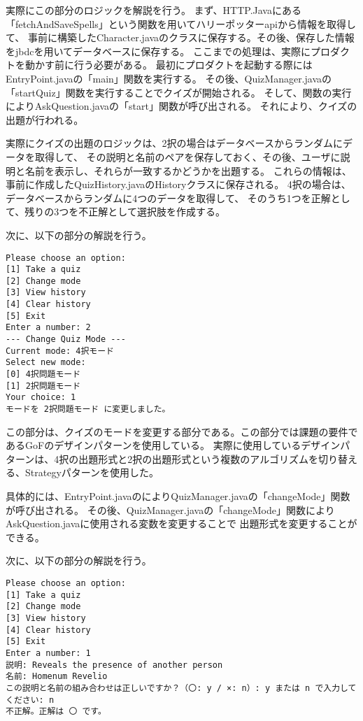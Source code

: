 \documentclass[uplatex,dvipdfmx,a4paper]{jsarticle}
\begin{document}
\par 実際にこの部分のロジックを解説を行う。
まず、HTTP.Javaにある「fetchAndSaveSpells」という関数を用いてハリーポッターapiから情報を取得して、
事前に構築したCharacter.javaのクラスに保存する。その後、保存した情報をjbdcを用いてデータベースに保存する。
ここまでの処理は、実際にプロダクトを動かす前に行う必要がある。
最初にプロダクトを起動する際にはEntryPoint.javaの「main」関数を実行する。
その後、QuizManager.javaの「startQuiz」関数を実行することでクイズが開始される。
そして、関数の実行によりAskQuestion.javaの「start」関数が呼び出される。
それにより、クイズの出題が行われる。
\par 実際にクイズの出題のロジックは、2択の場合はデータベースからランダムにデータを取得して、
その説明と名前のペアを保存しておく、その後、ユーザに説明と名前を表示し、それらが一致するかどうかを出題する。
これらの情報は、事前に作成したQuizHistory.javaのHistoryクラスに保存される。 4択の場合は、データベースからランダムに4つのデータを取得して、
そのうち1つを正解として、残りの3つを不正解として選択肢を作成する。
\par 次に、以下の部分の解説を行う。
\begin{lstlisting}[style=result]
  Please choose an option:
[1] Take a quiz
[2] Change mode
[3] View history
[4] Clear history
[5] Exit
Enter a number: 2
--- Change Quiz Mode ---
Current mode: 4択モード
Select new mode:
[0] 4択問題モード
[1] 2択問題モード
Your choice: 1
モードを 2択問題モード に変更しました。
\end{lstlisting}
\par この部分は、クイズのモードを変更する部分である。この部分では課題の要件であるGoFのデザインパターンを使用している。
実際に使用しているデザインパターンは、4択の出題形式と2択の出題形式という複数のアルゴリズムを切り替える、Strategyパターンを使用した。
\par 具体的には、EntryPoint.javaのによりQuizManager.javaの「changeMode」関数が呼び出される。
その後、QuizManager.javaの「changeMode」関数によりAskQuestion.javaに使用される変数を変更することで
出題形式を変更することができる。
\par 次に、以下の部分の解説を行う。
\begin{lstlisting}[style=result]
  Please choose an option:
[1] Take a quiz
[2] Change mode
[3] View history
[4] Clear history
[5] Exit
Enter a number: 1
説明: Reveals the presence of another person
名前: Homenum Revelio
この説明と名前の組み合わせは正しいですか？（〇: y / ×: n）: y または n で入力してください: n
不正解。正解は 〇 です。
\end{lstlisting}
\end{document}

